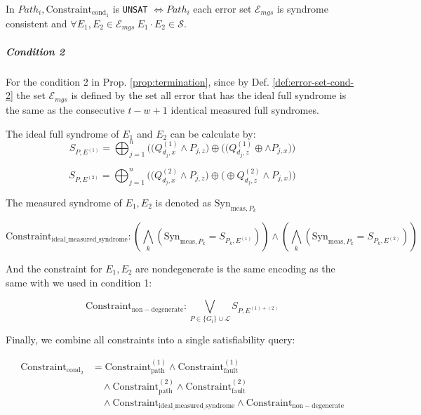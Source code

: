 \documentclass[acmsmallw,review]{acmart}
\begin{document}
\begin{lemma}
\label{lemma:cond1_ver}
In $Path_i, \mathrm{Constraint}_{\mathrm{cond_1}}$  is \texttt{UNSAT} $\Leftrightarrow  Path_i$  each error set $\mathcal{E}_{mgs}$ is syndrome consistent and $\forall E_1 ,E_2 \in \mathcal{E}_{mgs} \ E_1  \cdot E_2 \in \mathcal{S}$.
\end{lemma}

\subparagraph{\textbf{Condition 2} }
For the  condition 2 in Prop. \ref{prop:termination}, since by Def. \ref{def:error-set-cond-2} the set $\mathcal{E}_{mgs }$ is defined by the set all error that has the  ideal full syndrome is the same as the consecutive $t-w+1$ identical measured full syndromes.   

The ideal full syndrome of $E_1$ and $E_2$ can be calculate by:
\begin{equation}
S_{P, E^{(1)}} = \bigoplus_{j=1}^{n} \Big( \big( Q^{(1)}_{d_j, x} \land P_{j,z} \big) \oplus \big( (Q^{(1)}_{d_j, z} \oplus \land P_{j,x} \big) \Big)
\end{equation}

\begin{equation}
S_{P, E^{(2)}} = \bigoplus_{j=1}^{n} \Big( \big(  Q^{(2)}_{d_j, x} \land P_{j,z} \big) \oplus \big(  \oplus Q^{(2)}_{d_j, z} \land P_{j,x} \big) \Big)
\end{equation}

The measured syndrome of $E_1 , E_2 $ is denoted as $\mathrm{Syn}_{\mathrm{meas}, P_k}$

\begin{equation}
\mathrm{Constraint}_{\mathrm{ideal\_measured\_syndrome}} : (\bigwedge_k (\mathrm{Syn}_{\mathrm{meas}, P_k} = S_{P_k, E^{(1)}}) ) \land  (\bigwedge_k (\mathrm{Syn}_{\mathrm{meas}, P_k} = S_{P_k, E^{(2)}}) ) 
\end{equation}

And the constraint for $E_1, E_2$ are nondegenerate is the same encoding as the same with we used in condition 1:


\begin{equation}
\mathrm{Constraint}_{\mathrm{non-degenerate}} : \bigvee_{P \in \{G_l\} \cup \mathcal{L}} S_{P, E^{(1)+(2)}}
\end{equation}

Finally, we combine all constraints into a single satisfiability query:

\begin{equation}
\begin{aligned}
\mathrm{Constraint}_{\mathrm{cond_2}} &= \mathrm{Constraint}_{\mathrm{path}}^{(1)} \land \mathrm{Constraint}_{\mathrm{fault}}^{(1)} \\
&\quad \land \mathrm{Constraint}_{\mathrm{path}}^{(2)} \land \mathrm{Constraint}_{\mathrm{fault}}^{(2)} \\
&\quad \land \mathrm{Constraint}_{\mathrm{ideal\_measured\_syndrome}} \land \mathrm{Constraint}_{\mathrm{non-degenerate}} 
\end{aligned}
\end{equation}
\end{document}

